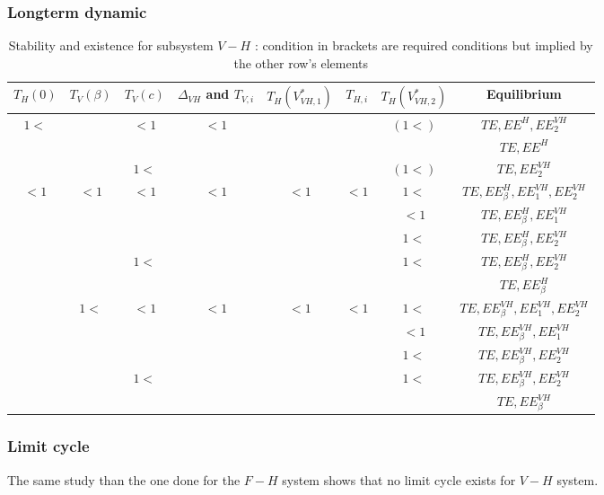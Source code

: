 \documentclass{article}
\begin{document}
\subsubsection{Longterm dynamic}

\begin{table}[ht]
\centering
\caption{\centering Stability and existence for subsystem $V-H$ : condition in brackets are required conditions but implied by the other row's elements}
\begin{tabular}{c|c|c|c|c|c|c|c}
$T_H(0)$ & $T_V(\beta)$ & $T_V(c)$ & $\Delta_{VH}$ and $T_{V,i}$ & $T_H(V^*_{VH,1})$ & $T_{H,i}$ & $T_H(V^*_{VH,2})$ & Equilibrium \\
\hline
\multirow{3}{*}{$1<$} & & \multirow{2}{*}{$<1$} &$<1$& & &$(1<)$ &$TE, EE^H, EE^{VH}_2$ \\
 & & & & & & &$TE, EE^H$ \\
 \cline{2-8}
 & &$1<$ & & & &$(1<)$ &$TE, EE^{VH}_2$ \\
\hline
\multirow{10}{*}{$<1$} & \multirow{5}{*}{$<1$} & \multirow{3}{*}{$<1$} &\multirow{3}{*}{$<1$} & \multirow{2}{*}{$<1$} & \multirow{2}{*}{$<1$} & $1<$ & $TE, EE^H_\beta, EE^{VH}_1, EE^{VH}_2$ \\
 & & & & & & $<1$ & $TE, EE^H_\beta, EE^{VH}_1$ \\
 \cline{5-8}
 & & & & & & $1<$ & $TE, EE^H_\beta, EE^{VH}_2$ \\
 \cline{3-8}
 & & $1<$ & & & & $1<$ & $TE, EE^H_\beta, EE^{VH}_2$ \\
 \cline{3-8}
 & & & & & & & $TE, EE^H_\beta$ \\
 \cline{2-8}
& \multirow{5}{*}{$1<$} & \multirow{3}{*}{$<1$} &\multirow{3}{*}{$<1$} & \multirow{2}{*}{$<1$} & \multirow{2}{*}{$<1$} & $1<$ & $TE, EE^{VH}_\beta, EE^{VH}_1, EE^{VH}_2$ \\
 & & & & & & $<1$ & $TE, EE^{VH}_\beta, EE^{VH}_1$ \\
 \cline{5-8}
 & & & & & & $1<$ & $TE, EE^{VH}_\beta, EE^{VH}_2$ \\
 \cline{3-8}
 & & $1<$ & & & & $1<$ & $TE, EE^{VH}_\beta, EE^{VH}_2$ \\
 \cline{3-8}
 & & & & & & & $TE, EE^{VH}_\beta$ \\
 \hline
\end{tabular}
\end{table}

\subsubsection{Limit cycle}
The same study than the one done for the $F-H$ system shows that no limit cycle exists for $V-H$ system.
\end{document}
